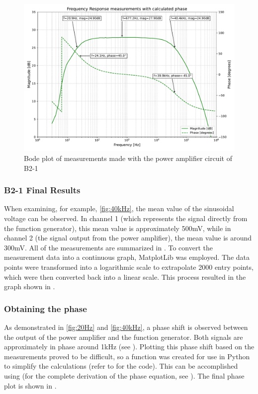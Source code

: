 \begin{figure}[h]
    \centering
    \includegraphics[width=0.9\linewidth]{TU Delft Booming Bass Project Report/figures/PowerAmplifier/measurements/metingen met misschien goede phase.pdf}
    \caption{Bode plot of measurements made with the power amplifier circuit of B2-1}
    \label{fig:freq response with phase}
\end{figure}

\subsubsection{B2-1 Final Results}

When examining, for example, \autoref{fig:40kHz}, the mean value of the sinusoidal voltage can be observed. In channel 1 (which represents the signal directly from the function generator), this mean value is approximately 500mV, while in channel 2 (the signal output from the power amplifier), the mean value is around 300mV. All of the measurements are summarized in . To convert the measurement data into a continuous graph, MatplotLib was employed. The data points were transformed into a logarithmic scale to extrapolate 2000 entry points, which were then converted back into a linear scale. This process resulted in the graph shown in .

\subsubsection{Obtaining the phase}
As demonstrated in \autoref{fig:20Hz} and \autoref{fig:40kHz}, a phase shift is observed between the output of the power amplifier and the function generator. Both signals are approximately in phase around 1kHz (see ). Plotting this phase shift based on the measurements proved to be difficult, so a function was created for use in Python to simplify the calculations (refer to  for the code). This can be accomplished using  (for the complete derivation of the phase equation, see ). The final phase plot is shown in .

